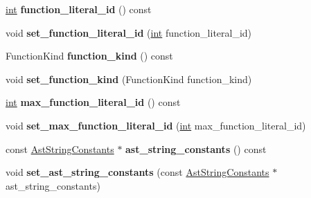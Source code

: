 \begin{DoxyCompactItemize}
\item 
\mbox{\label{classv8_1_1internal_1_1ParseInfo_a2e196c687b0b20ee91b12b101a4bbe3e}} 
\mbox{\hyperlink{classint}{int}} {\bfseries function\+\_\+literal\+\_\+id} () const
\item 
\mbox{\label{classv8_1_1internal_1_1ParseInfo_a8550cefe27120a84c8f5848b89e8dc18}} 
void {\bfseries set\+\_\+function\+\_\+literal\+\_\+id} (\mbox{\hyperlink{classint}{int}} function\+\_\+literal\+\_\+id)
\item 
\mbox{\label{classv8_1_1internal_1_1ParseInfo_a146dfa0f25b22b0651dc27992e796fe8}} 
Function\+Kind {\bfseries function\+\_\+kind} () const
\item 
\mbox{\label{classv8_1_1internal_1_1ParseInfo_acc2d37520a3368ceca7d7de7a3f31c2c}} 
void {\bfseries set\+\_\+function\+\_\+kind} (Function\+Kind function\+\_\+kind)
\item 
\mbox{\label{classv8_1_1internal_1_1ParseInfo_af3ee19ef49878e465ec50fdbf4d56e12}} 
\mbox{\hyperlink{classint}{int}} {\bfseries max\+\_\+function\+\_\+literal\+\_\+id} () const
\item 
\mbox{\label{classv8_1_1internal_1_1ParseInfo_ad6af952a8e68873fe17e0cb0eb9584b2}} 
void {\bfseries set\+\_\+max\+\_\+function\+\_\+literal\+\_\+id} (\mbox{\hyperlink{classint}{int}} max\+\_\+function\+\_\+literal\+\_\+id)
\item 
\mbox{\label{classv8_1_1internal_1_1ParseInfo_a42f0942e250682ee44ac634dd22423b6}} 
const \mbox{\hyperlink{classv8_1_1internal_1_1AstStringConstants}{Ast\+String\+Constants}} $\ast$ {\bfseries ast\+\_\+string\+\_\+constants} () const
\item 
\mbox{\label{classv8_1_1internal_1_1ParseInfo_a2433e13462d75f18d98127a2913151d2}} 
void {\bfseries set\+\_\+ast\+\_\+string\+\_\+constants} (const \mbox{\hyperlink{classv8_1_1internal_1_1AstStringConstants}{Ast\+String\+Constants}} $\ast$ast\+\_\+string\+\_\+constants)
\item 

\end{DoxyCompactItemize}
